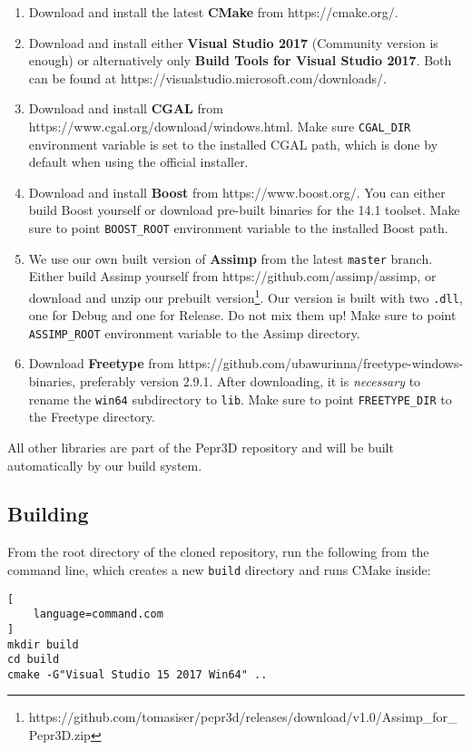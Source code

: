 \begin{enumerate}
\item Download and install the latest \textbf{CMake} from https://cmake.org/.
\item Download and install either \textbf{Visual Studio 2017} (Community version is enough) or alternatively only \textbf{Build Tools for Visual Studio 2017}. Both can be found at https://visualstudio.microsoft.com/downloads/.
\item Download and install \textbf{CGAL} from https://www.cgal.org/download/windows.html. Make sure \texttt{CGAL\_DIR} environment variable is set to the installed CGAL path, which is done by default when using the official installer.
\item Download and install \textbf{Boost} from https://www.boost.org/. You can either build Boost yourself or download pre-built binaries for the 14.1 toolset. Make sure to point \texttt{BOOST\_ROOT} environment variable to the installed Boost path.
\item We use our own built version of \textbf{Assimp} from the latest \texttt{master} branch. Either build Assimp yourself from https://github.com/assimp/assimp, or download and unzip our prebuilt version\footnote{https://github.com/tomasiser/pepr3d/releases/download/v1.0/Assimp\_for\_Pepr3D.zip}. Our version is built with two \texttt{.dll}, one for Debug and one for Release. Do not mix them up! Make sure to point \texttt{ASSIMP\_ROOT} environment variable to the Assimp directory.
\item Download \textbf{Freetype} from https://github.com/ubawurinna/freetype-windows-binaries, preferably version 2.9.1. After downloading, it is \emph{necessary} to rename the \texttt{win64} subdirectory to \texttt{lib}. Make sure to point \texttt{FREETYPE\_DIR} to the Freetype directory.
\end{enumerate}

All other libraries are part of the Pepr3D repository and will be built automatically by our build system.

\subsection{Building}

From the root directory of the cloned repository, run the following from the command line, which creates a new \texttt{build} directory and runs CMake inside:

\begin{lstlisting}[
    language=command.com
]
mkdir build
cd build
cmake -G"Visual Studio 15 2017 Win64" ..
\end{lstlisting}

